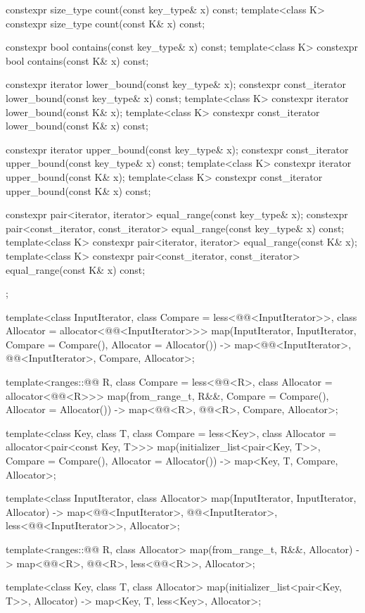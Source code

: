 \begin{codeblock}
{{    constexpr size_type      count(const key_type& x) const;
    template<class K> constexpr size_type count(const K& x) const;

    constexpr bool           contains(const key_type& x) const;
    template<class K> constexpr bool contains(const K& x) const;

    constexpr iterator       lower_bound(const key_type& x);
    constexpr const_iterator lower_bound(const key_type& x) const;
    template<class K> constexpr iterator       lower_bound(const K& x);
    template<class K> constexpr const_iterator lower_bound(const K& x) const;

    constexpr iterator       upper_bound(const key_type& x);
    constexpr const_iterator upper_bound(const key_type& x) const;
    template<class K> constexpr iterator       upper_bound(const K& x);
    template<class K> constexpr const_iterator upper_bound(const K& x) const;

    constexpr pair<iterator, iterator>               equal_range(const key_type& x);
    constexpr pair<const_iterator, const_iterator>   equal_range(const key_type& x) const;
    template<class K>
      constexpr pair<iterator, iterator>             equal_range(const K& x);
    template<class K>
      constexpr pair<const_iterator, const_iterator> equal_range(const K& x) const;
  };

  template<class InputIterator, class Compare = less<@@<InputIterator>>,
           class Allocator = allocator<@@<InputIterator>>>
    map(InputIterator, InputIterator, Compare = Compare(), Allocator = Allocator())
      -> map<@@<InputIterator>, @@<InputIterator>, Compare, Allocator>;

  template<ranges::@@ R, class Compare = less<@@<R>,
           class Allocator = allocator<@@<R>>>
    map(from_range_t, R&&, Compare = Compare(), Allocator = Allocator())
      -> map<@@<R>, @@<R>, Compare, Allocator>;

  template<class Key, class T, class Compare = less<Key>,
           class Allocator = allocator<pair<const Key, T>>>
    map(initializer_list<pair<Key, T>>, Compare = Compare(), Allocator = Allocator())
      -> map<Key, T, Compare, Allocator>;

  template<class InputIterator, class Allocator>
    map(InputIterator, InputIterator, Allocator)
      -> map<@@<InputIterator>, @@<InputIterator>,
             less<@@<InputIterator>>, Allocator>;

  template<ranges::@@ R, class Allocator>
    map(from_range_t, R&&, Allocator)
      -> map<@@<R>, @@<R>, less<@@<R>>, Allocator>;

  template<class Key, class T, class Allocator>
    map(initializer_list<pair<Key, T>>, Allocator) -> map<Key, T, less<Key>, Allocator>;
}
\end{codeblock}


